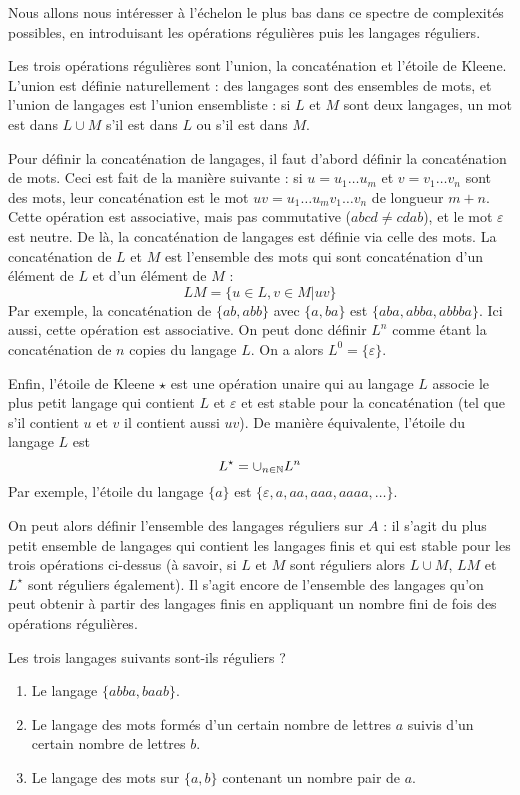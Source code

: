 Nous allons nous intéresser à l'échelon le plus bas dans ce spectre de complexités possibles, en introduisant les opérations régulières puis les langages réguliers.

Les trois opérations régulières sont l'union, la concaténation et l'étoile de Kleene.
L'union est définie naturellement : des langages sont des ensembles de mots, et l'union de langages est l'union ensembliste : si $L$ et $M$ sont deux langages, un mot est dans $L\cup M$ s'il est dans $L$ ou s'il est dans $M$.

Pour définir la concaténation de langages, il faut d'abord définir la concaténation de mots. Ceci est fait de la manière suivante : si $u = u_1 \dots u_m$ et $v = v_1 \dots v_n$ sont des mots, leur concaténation est le mot $uv = u_1 \dots u_m v_1 \dots v_n$ de longueur $m + n$. Cette opération est associative, mais pas commutative ($abcd \ne cdab$), et le mot $\varepsilon$ est neutre. De là, la concaténation de langages est définie via celle des mots. La concaténation de $L$ et $M$ est l'ensemble des mots qui sont concaténation d'un élément de $L$ et d'un élément de $M$ :
$$LM = \{u\in L, v\in M | uv\}$$
Par exemple, la concaténation de $\{ab, abb\}$ avec $\{a, ba\}$ est $\{aba, abba, abbba\}$. Ici aussi, cette opération est associative. On peut donc définir $L^n$ comme étant la concaténation de $n$ copies du langage $L$. On a alors $L^0 = \{\varepsilon\}$.

Enfin, l'étoile de Kleene $\star$ est une opération unaire qui au langage $L$ associe le plus petit langage qui contient $L$ et $\varepsilon$ et est stable pour la concaténation (tel que s'il contient $u$ et $v$ il contient aussi $uv$). De manière équivalente, l'étoile du langage $L$ est
$$L^\star = \cup_{n\in\mathbb N} L^n$$
Par exemple, l'étoile du langage $\{a\}$ est $\{\varepsilon, a, aa, aaa, aaaa, \dots\}$.

On peut alors définir l'ensemble des langages réguliers sur $A$ : il s'agit du plus petit ensemble de langages qui contient les langages finis et qui est stable pour les trois opérations ci-dessus (à savoir, si $L$ et $M$ sont réguliers alors $L\cup M$, $LM$ et $L^\star$ sont réguliers également). Il s'agit encore de l'ensemble des langages qu'on peut obtenir à partir des langages finis en appliquant un nombre fini de fois des opérations régulières.

\begin{exo}
Les trois langages suivants sont-ils réguliers ?
\begin{enumerate}
\item Le langage $\{abba, baab\}$.
\item Le langage des mots formés d'un certain nombre de lettres $a$ suivis d'un certain nombre de lettres $b$.
\item Le langage des mots sur $\{a, b\}$ contenant un nombre pair de $a$.
\end{enumerate}
\end{exo}

